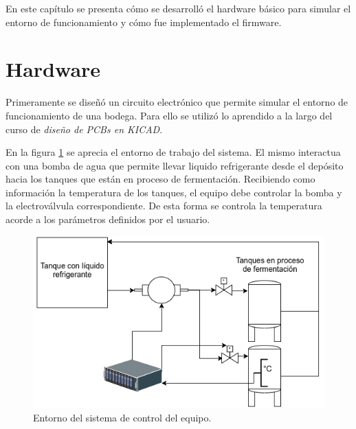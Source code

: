 En este capítulo se presenta cómo se desarrolló el hardware básico para simular el entorno de funcionamiento y cómo fue implementado el firmware.

\section{Hardware}

Primeramente se diseñó un circuito electrónico que permite simular el entorno de funcionamiento de una bodega. Para ello se utilizó lo aprendido a la largo del curso de \emph{diseño de PCBs en KICAD}. 

En la figura \ref{fig:diagrama_sistema} se aprecia el entorno de trabajo del sistema. El mismo interactua con una bomba de agua que permite llevar liquido refrigerante desde el depósito hacia los tanques que están en proceso de fermentación.
Recibiendo como información la temperatura de los tanques, el equipo debe controlar la bomba y la electroválvula correspondiente. De esta forma se controla la temperatura acorde a los parámetros definidos por el usuario. 


\begin{figure}[!htb]
  \centering
  \includegraphics[scale=0.7]{./Figures/diagrama_del_sistema.png}
  \caption{Entorno del sistema de control del equipo.}
  \label{fig:diagrama_sistema}
\end{figure}

